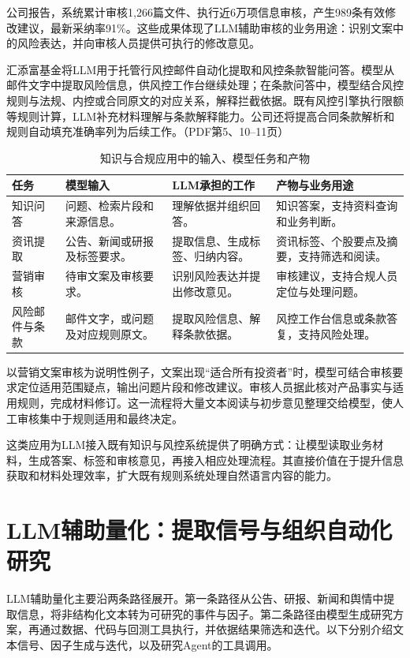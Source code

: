 \documentclass[11pt,a4paper,fontset=none]{ctexart}
\begin{document}
公司报告，系统累计审核1,266篇文件、执行近6万项信息审核，产生989条有效修改建议，最新采纳率91\%。这些成果体现了LLM辅助审核的业务用途：识别文案中的风险表达，并向审核人员提供可执行的修改意见。

汇添富基金将LLM用于托管行风控邮件自动化提取和风控条款智能问答。模型从邮件文字中提取风险信息，供风控工作台继续处理；在条款问答中，模型结合风控规则与法规、内控或合同原文的对应关系，解释拦截依据。既有风控引擎执行限额等规则计算，LLM补充材料理解与条款解释能力。公司还将提高合同条款解析和规则自动填充准确率列为后续工作。（PDF第5、10--11页）

\begin{table}[H]\small\centering
\caption{知识与合规应用中的输入、模型任务和产物}
\begin{tabularx}{\linewidth}{@{}P{25mm}Y Y Y@{}}\toprule
任务 & 模型输入 & LLM承担的工作 & 产物与业务用途\\\midrule
知识问答 & 问题、检索片段和来源信息。 & 理解依据并组织回答。 & 知识答案，支持资料查询和业务判断。\\
资讯提取 & 公告、新闻或研报及标签要求。 & 提取信息、生成标签、归纳内容。 & 资讯标签、个股要点及摘要，支持筛选和阅读。\\
营销审核 & 待审文案及审核要求。 & 识别风险表达并提出修改意见。 & 审核建议，支持合规人员定位与处理问题。\\
风险邮件与条款 & 邮件文字，或问题及对应规则原文。 & 提取风险信息、解释条款依据。 & 风控工作台信息或条款答复，支持风险处理。\\\bottomrule
\end{tabularx}
\end{table}

以营销文案审核为说明性例子，文案出现“适合所有投资者”时，模型可结合审核要求定位适用范围疑点，输出问题片段和修改建议。审核人员据此核对产品事实与适用规则，完成材料修订。这一流程将大量文本阅读与初步意见整理交给模型，使人工审核集中于规则适用和最终决定。

这类应用为LLM接入既有知识与风控系统提供了明确方式：让模型读取业务材料，生成答案、标签和审核意见，再接入相应处理流程。其直接价值在于提升信息获取和材料处理效率，扩大既有规则系统处理自然语言内容的能力。
\section{LLM辅助量化：提取信号与组织自动化研究}
LLM辅助量化主要沿两条路径展开。第一条路径从公告、研报、新闻和舆情中提取信息，将非结构化文本转为可研究的事件与因子。第二条路径由模型生成研究方案，再通过数据、代码与回测工具执行，并依据结果筛选和迭代。以下分别介绍文本信号、因子生成与迭代，以及研究Agent的工具调用。
\end{document}
